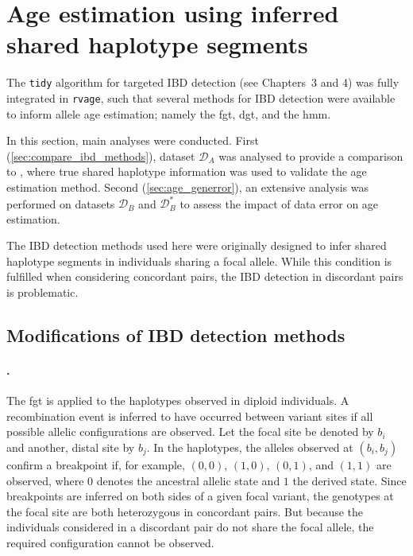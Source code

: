 %
\section{Age estimation using inferred shared haplotype segments}
%


The \texttt{tidy} algorithm for targeted IBD detection (see Chapters~3 and 4) was fully integrated in \texttt{rvage}, such that several methods for IBD detection were available to inform allele age estimation;
namely the \gls{fgt}, \gls{dgt}, and the  \gls{hmm}.

In this section,  main analyses were conducted.
First (\cref{sec:compare_ibd_methods}), dataset $\mathcal{D}_A$ was analysed to provide a comparison to , where true shared haplotype information was used to validate the age estimation method.
Second (\cref{sec:age_generror}), an extensive analysis was performed on datasets $\mathcal{D}_B$ and $\mathcal{D}_B^{\ast}$ to assess the impact of data error on age estimation.

The IBD detection methods used here were originally designed to infer shared haplotype segments in individuals sharing a focal allele.
While this condition is fulfilled when considering concordant pairs, the IBD detection in discordant pairs is problematic.


%
\subsection{Modifications of IBD detection methods}
%

\paragraph{.}
The \gls{fgt} is applied to the  haplotypes observed in  diploid individuals.
A recombination event is inferred to have occurred between  variant sites if all  possible allelic configurations are observed.
Let the focal site be denoted by $b_i$ and another, distal site by $b_j$.
In the  haplotypes, the alleles observed at ${(b_i,b_j)}$ confirm a breakpoint if, for example, ${(0,0)}$, ${(1,0)}$, ${(0,1)}$, and ${(1,1)}$ are observed, where $0$ denotes the ancestral allelic state and $1$ the derived state.
Since breakpoints are inferred on both sides of a given focal variant, the genotypes at the focal site are both heterozygous in concordant pairs.
But because the  individuals considered in a discordant pair do not share the focal allele, the required configuration cannot be observed.

